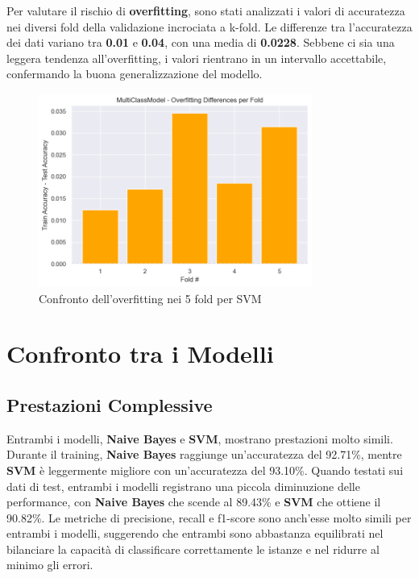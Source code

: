 Per valutare il rischio di \textbf{overfitting}, sono stati analizzati i valori di accuratezza nei diversi fold della validazione incrociata a k-fold. Le differenze tra l'accuratezza dei dati variano tra \textbf{0.01} e \textbf{0.04}, con una media di \textbf{0.0228}. Sebbene ci sia una leggera tendenza all'overfitting, i valori rientrano in un intervallo accettabile, confermando la buona generalizzazione del modello.

\begin{figure}[H]
    \centering
    \includegraphics[width=0.8\textwidth]{images/overfitting_svm.png}
    \caption{Confronto dell'overfitting nei 5 fold per SVM}
    \label{fig:overfitting_svm}
\end{figure}

\newpage

\section{Confronto tra i Modelli}

\subsection{Prestazioni Complessive}

Entrambi i modelli, \textbf{Naive Bayes} e \textbf{SVM}, mostrano prestazioni molto simili. Durante il training, \textbf{Naive Bayes} raggiunge un'accuratezza del 92.71\%, mentre \textbf{SVM} è leggermente migliore con un'accuratezza del 93.10\%. Quando testati sui dati di test, entrambi i modelli registrano una piccola diminuzione delle performance, con \textbf{Naive Bayes} che scende al 89.43\% e \textbf{SVM} che ottiene il 90.82\%. Le metriche di precisione, recall e f1-score sono anch'esse molto simili per entrambi i modelli, suggerendo che entrambi sono abbastanza equilibrati nel bilanciare la capacità di classificare correttamente le istanze e nel ridurre al minimo gli errori.

